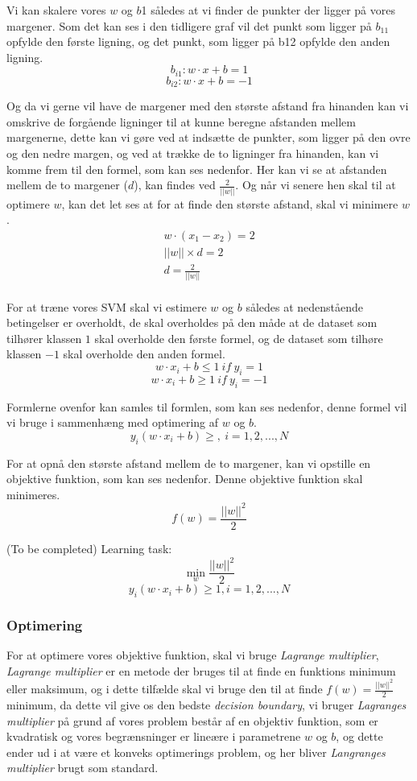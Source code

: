\documentclass{article}
\begin{document}
Vi kan skalere vores $w$ og $b$1 således at vi finder de punkter der ligger på vores margener. Som det kan ses i den tidligere graf vil det punkt som ligger på $b_{11}$ opfylde den første ligning, og det punkt, som ligger på b12 opfylde den anden ligning. 
$$b_{i1}: w \cdot x + b = 1$$
$$b_{i2}: w \cdot x + b = -1$$

Og da vi gerne vil have de margener med den største afstand fra hinanden kan vi omskrive de forgående ligninger til at kunne beregne afstanden mellem margenerne, dette kan vi gøre ved at indsætte de punkter, som ligger på den ovre og den nedre margen, og ved at trække de to ligninger fra hinanden, kan vi komme frem til den formel, som kan ses nedenfor. Her kan vi se at afstanden mellem de to margener ($d$), kan findes ved $\frac{2}{||w||}$. Og når vi senere hen skal til at optimere $w$, kan det let ses at for at finde den største afstand, skal vi minimere $w$. 
\begin{align*}
w \cdot (x_1 - x_2) = 2 \\
||w|| \times d = 2 \\
d = \frac{2}{||w||} \\
\end{align*}

For at træne vores SVM skal vi estimere $w$ og $b$ således at nedenstående betingelser er overholdt, de skal overholdes på den måde at de dataset som tilhører klassen $1$ skal overholde den første formel, og de dataset som tilhøre klassen $-1$ skal overholde den anden formel. 
$$w \cdot x_i + b \leq 1 \ if \ y_i = 1$$
$$w \cdot x_i + b \geq 1 \ if \ y_i = -1$$

Formlerne ovenfor kan samles til formlen, som kan ses nedenfor, denne formel vil vi bruge i sammenhæng med optimering af $w$ og $b$. 
$$y_i(w \cdot x_i + b) \geq, \ i =1,2,...,N$$

For at opnå den største afstand mellem de to margener, kan vi opstille en objektive funktion, som kan ses nedenfor. Denne objektive funktion skal minimeres.  
$$f(w)=\frac{||w||^2}{2}$$

(To be completed)
Learning task:
$$\min\limits_{w} \frac{||w||^2}{2}$$
$$y_i(w \cdot x_i + b) \geq 1, i = 1,2,...,N$$

\subsubsection{Optimering}
For at optimere vores objektive funktion, skal vi bruge \textit{Lagrange multiplier}, \textit{Lagrange multiplier} er en metode der bruges til at finde en funktions minimum eller maksimum, og i dette tilfælde skal vi bruge den til at finde $f(w)=\frac{||w||^2}{2}$ minimum, da dette vil give os den bedste \textit{decision boundary}, vi bruger \textit{Lagranges multiplier} på grund af vores problem består af en objektiv funktion, som er kvadratisk og vores begrænsninger er lineære i parametrene $w$ og $b$, og dette ender ud i at være et konveks optimerings problem, og her bliver \textit{Langranges multiplier} brugt som standard.
\end{document}
